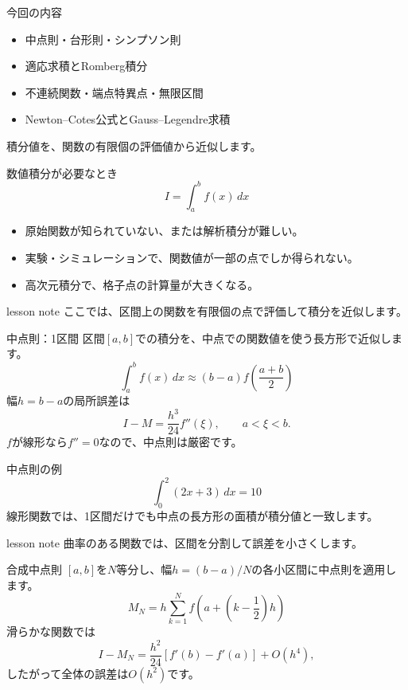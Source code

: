 \documentclass[12pt,aspectratio=43]{beamer}
\newenvironment{lessonbox}
  {\begin{beamercolorbox}[wd=\linewidth,sep=1.5mm]{lesson note}}
  {\end{beamercolorbox}\par}
\begin{document}
\begin{frame}[t]{今回の内容}
  \begin{itemize}
    \setlength{\itemsep}{3mm}
    \item 中点則・台形則・シンプソン則
    \item 適応求積とRomberg積分
    \item 不連続関数・端点特異点・無限区間
    \item Newton--Cotes公式とGauss--Legendre求積
  \end{itemize}
  \vfill
  \small 積分値を、関数の有限個の評価値から近似します。
\end{frame}

\begin{frame}[t]{数値積分が必要なとき}
  \[
    I=\int_a^b f(x)\,dx
  \]
  \begin{itemize}
    \setlength{\itemsep}{3mm}
    \item 原始関数が知られていない、または解析積分が難しい。
    \item 実験・シミュレーションで、関数値が一部の点でしか得られない。
    \item 高次元積分で、格子点の計算量が大きくなる。
  \end{itemize}
  \vspace{2mm}
  \begin{lessonbox}
    ここでは、区間上の関数を有限個の点で評価して積分を近似します。
  \end{lessonbox}
\end{frame}

\begin{frame}[t]{中点則：1区間}
  区間$[a,b]$での積分を、中点での関数値を使う長方形で近似します。
  \[
    \int_a^b f(x)\,dx\approx(b-a)f\!\left(\frac{a+b}{2}\right)
  \]
  幅$h=b-a$の局所誤差は
  \[
    I-M=\frac{h^3}{24}f''(\xi),\qquad a<\xi<b.
  \]
  \small $f$が線形なら$f''=0$なので、中点則は厳密です。
\end{frame}

\begin{frame}[t]{中点則の例}
  \[
    \int_0^2 (2x+3)\,dx=10
  \]
  線形関数では、1区間だけでも中点の長方形の面積が積分値と一致します。
  \vspace{3mm}
  \begin{lessonbox}
    曲率のある関数では、区間を分割して誤差を小さくします。
  \end{lessonbox}
\end{frame}

\begin{frame}[t]{合成中点則}
  $[a,b]$を$N$等分し、幅$h=(b-a)/N$の各小区間に中点則を適用します。
  \[
    M_N=h\sum_{k=1}^{N} f\!\left(a+\left(k-\frac12\right)h\right)
  \]
  滑らかな関数では
  \[
    I-M_N=\frac{h^2}{24}\left[f'(b)-f'(a)\right]+O(h^4),
  \]
  したがって全体の誤差は$O(h^2)$です。
\end{frame}
\end{document}
